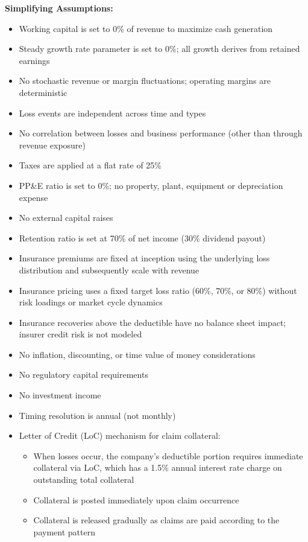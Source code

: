 \documentclass[11pt,letterpaper]{article}
\begin{document}
\textbf{Simplifying Assumptions:}
\begin{itemize}
    \item Working capital is set to 0\% of revenue to maximize cash generation
    \item Steady growth rate parameter is set to 0\%; all growth derives from retained earnings
    \item No stochastic revenue or margin fluctuations; operating margins are deterministic
    \item Loss events are independent across time and types
    \item No correlation between losses and business performance (other than through revenue exposure)
    \item Taxes are applied at a flat rate of 25\%
    \item PP\&E ratio is set to 0\%; no property, plant, equipment or depreciation expense
    \item No external capital raises
    \item Retention ratio is set at 70\% of net income (30\% dividend payout)
    \item Insurance premiums are fixed at inception using the underlying loss distribution and subsequently scale with revenue
    \item Insurance pricing uses a fixed target loss ratio (60\%, 70\%, or 80\%) without risk loadings or market cycle dynamics
    \item Insurance recoveries above the deductible have no balance sheet impact; insurer credit risk is not modeled
    \item No inflation, discounting, or time value of money considerations
    \item No regulatory capital requirements
    \item No investment income
    \item Timing resolution is annual (not monthly)
    \item Letter of Credit (LoC) mechanism for claim collateral:
        \begin{itemize}[label=$\circ$]
            \item When losses occur, the company's deductible portion requires immediate collateral via LoC, which has a 1.5\% annual interest rate charge on outstanding total collateral
            \item Collateral is posted immediately upon claim occurrence
            \item Collateral is released gradually as claims are paid according to the payment pattern

\end{itemize}
\end{itemize}
\end{document}
